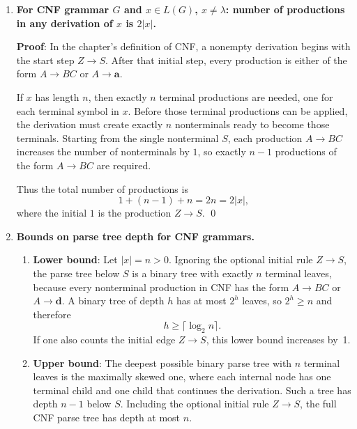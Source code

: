 \begin{enumerate}[{9.}1. ]
Conversely, every derivation in $G'$ can be compressed to one in $G$: each new
symbol $Y_{ki}$ occurs in only one replacement set, so any maximal block of
steps using $Y_{ki}$ symbols is simply the expanded form of one original
production of $G$.  Replacing each such block by the corresponding production of
$G$ yields a derivation of the same terminal string in $G$.

Therefore $L(G)=L(G')$. \qed

\item \textbf{For CNF grammar $G$ and $x \in L(G)$, $x \neq \lambda$: number of productions in any derivation of $x$ is $2|x|$.}

\textbf{Proof}: In the chapter's definition of CNF, a nonempty derivation begins
with the start step $Z\to S$.  After that initial step, every production is
either of the form $A\to BC$ or $A\to\pmb{a}$.

If $x$ has length $n$, then exactly $n$ terminal productions are needed, one
for each terminal symbol in $x$.  Before those terminal productions can be
applied, the derivation must create exactly $n$ nonterminals ready to become
those terminals.  Starting from the single nonterminal $S$, each production
$A\to BC$ increases the number of nonterminals by $1$, so exactly $n-1$
productions of the form $A\to BC$ are required.

Thus the total number of productions is
\[
1+(n-1)+n=2n=2|x|,
\]
where the initial $1$ is the production $Z\to S$. \qed

\item \textbf{Bounds on parse tree depth for CNF grammars.}

\begin{enumerate}
\item \textbf{Lower bound}: Let $|x|=n>0$.  Ignoring the optional initial
rule $Z\to S$, the parse tree below $S$ is a binary tree with exactly $n$
terminal leaves, because every nonterminal production in CNF has the form
$A\to BC$ or $A\to \pmb{d}$.  A binary tree of depth $h$ has at most $2^h$
leaves, so $2^h\geq n$ and therefore
\[
h\geq \lceil \log_2 n\rceil.
\]
If one also counts the initial edge $Z\to S$, this lower bound increases by~1.

\item \textbf{Upper bound}: The deepest possible binary parse tree with $n$
terminal leaves is the maximally skewed one, where each internal node has one
terminal child and one child that continues the derivation.  Such a tree has
depth $n-1$ below $S$.  Including the optional initial rule $Z\to S$, the full
CNF parse tree has depth at most $n$.


\end{enumerate}
\end{enumerate}
